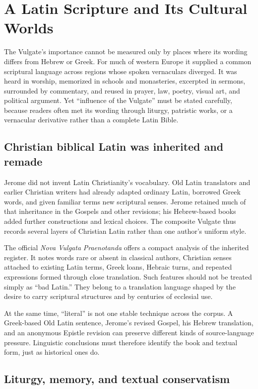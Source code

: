 \section{A Latin Scripture and Its Cultural Worlds}

The Vulgate's importance cannot be measured only by places where its wording differs from Hebrew or Greek. For much of western Europe it supplied a common scriptural language across regions whose spoken vernaculars diverged. It was heard in worship, memorized in schools and monasteries, excerpted in sermons, surrounded by commentary, and reused in prayer, law, poetry, visual art, and political argument. Yet ``influence of the Vulgate'' must be stated carefully, because readers often met its wording through liturgy, patristic works, or a vernacular derivative rather than a complete Latin Bible.

\subsection{Christian biblical Latin was inherited and remade}

Jerome did not invent Latin Christianity's vocabulary. Old Latin translators and earlier Christian writers had already adapted ordinary Latin, borrowed Greek words, and given familiar terms new scriptural senses. Jerome retained much of that inheritance in the Gospels and other revisions; his Hebrew-based books added further constructions and lexical choices. The composite Vulgate thus records several layers of Christian Latin rather than one author's uniform style.

The official \emph{Nova Vulgata} \emph{Praenotanda} offers a compact analysis of the inherited register. It notes words rare or absent in classical authors, Christian senses attached to existing Latin terms, Greek loans, Hebraic turns, and repeated expressions formed through close translation. Such features should not be treated simply as ``bad Latin.'' They belong to a translation language shaped by the desire to carry scriptural structures and by centuries of ecclesial use.

At the same time, ``literal'' is not one stable technique across the corpus. A Greek-based Old Latin sentence, Jerome's revised Gospel, his Hebrew translation, and an anonymous Epistle revision can preserve different kinds of source-language pressure. Linguistic conclusions must therefore identify the book and textual form, just as historical ones do.

\subsection{Liturgy, memory, and textual conservatism}

